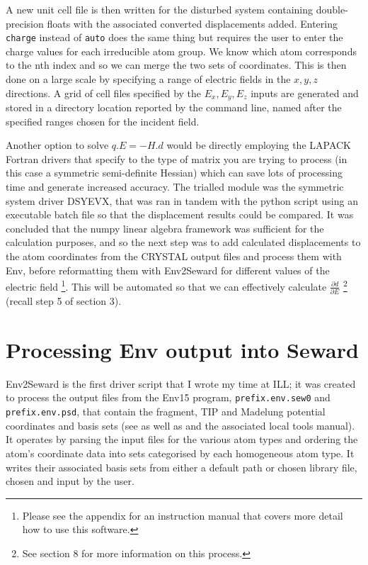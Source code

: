 \documentclass[10pt]{article}
\begin{document}
A new unit cell file is then written for the disturbed system containing double-precision floats with the associated converted displacements added. Entering \texttt{charge} instead of \texttt{auto} does the same thing but requires the user to enter the charge values for each irreducible atom group. We know which atom corresponds to the nth index and so we can merge the two sets of coordinates. This is then done on a large scale by specifying a range of electric fields in the $x,y,z$ directions. A grid of cell files specified by the $E_x,E_y,E_z$ inputs are generated and stored in a directory location reported by the command line, named after the specified ranges chosen for the incident field.

Another option to solve $q.E = -H.d$ would be directly employing the LAPACK Fortran drivers that specify to the type of matrix you are trying to process (in this case a symmetric semi-definite Hessian) which can save lots of processing time and generate increased accuracy. The trialled module was the symmetric system driver DSYEVX, that was ran in tandem with the python script using an executable batch file so that the displacement results could be compared. It was concluded that the numpy linear algebra framework was sufficient for the calculation purposes, and so the next step was to add calculated displacements to the atom coordinates from the CRYSTAL output files and process them with Env, before reformatting them with Env2Seward for different values of the electric field \footnote{Please see the appendix for an instruction manual that covers more detail how to use this software.}. This will be automated so that we can effectively calculate $\frac{\partial d}{\partial E}$ \footnote{See section 8 for more information on this process.} (recall step 5 of section 3). 



\section{Processing Env output into Seward}
Env2Seward is the first driver script that I wrote my time at ILL; it was created to process the output files from the Env15 program, \texttt{prefix.env.sew0} and \texttt{prefix.env.psd}, that contain the fragment, TIP and Madelung potential coordinates and basis sets (see \cite{varignon2013ab} as well as \cite{gelle2008fast} and the associated local tools manual). It operates by parsing the input files for the various atom types and ordering the atom's coordinate data into sets categorised by each homogeneous atom type. It writes their associated basis sets from either a default path or chosen library file, chosen and input by the user.
\end{document}
